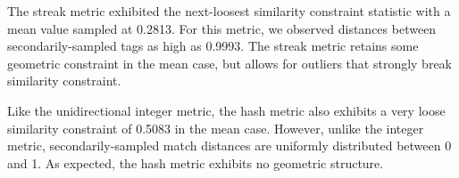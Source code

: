 
The streak metric exhibited the next-loosest similarity constraint statistic with a mean value sampled at 0.2813.
For this metric, we observed distances between secondarily-sampled tags as high as 0.9993.
The streak metric retains some geometric constraint in the mean case, but allows for outliers that strongly break similarity constraint.

Like the unidirectional integer metric, the hash metric also exhibits a very loose similarity constraint of 0.5083 in the mean case.
However, unlike the integer metric, secondarily-sampled match distances are uniformly distributed between 0 and 1.
As expected, the hash metric exhibits no geometric structure.
